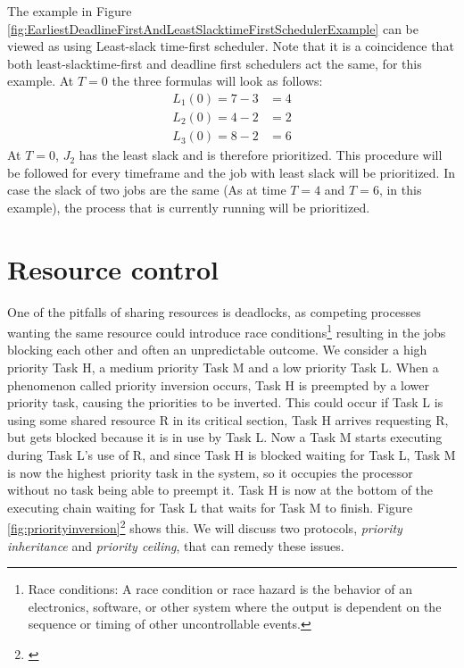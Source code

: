 \noindent The example in Figure \ref{fig:EarliestDeadlineFirstAndLeastSlacktimeFirstSchedulerExample} can be viewed as using Least-slack time-first scheduler. Note that it is a coincidence that both least-slacktime-first and deadline first schedulers act the same, for this example. At $T=0$ the three formulas will look as follows:
\begin{align}
	L_1(0)=7-3&=4 \\
	L_2(0)=4-2&=2 \\
	L_3(0)=8-2&=6
\end{align}
At $T=0$, $J_2$ has the least slack and is therefore prioritized. This procedure will be followed for every timeframe and the job with least slack will be prioritized. In case the slack of two jobs are the same (As at time $T=4$ and $T=6$, in this example), the process that is currently running will be prioritized.

\section{Resource control}

One of the pitfalls of sharing resources is deadlocks, as competing processes wanting the same resource could introduce race conditions\footnote{Race conditions: A race condition or race hazard is the behavior of an electronics, software, or other system where the output is dependent on the sequence or timing of other uncontrollable events.} resulting in the jobs blocking each other and often an unpredictable outcome. We consider a high priority Task H, a medium priority Task M and a low priority Task L. When a phenomenon called priority inversion occurs, Task H is preempted by a lower priority task, causing the priorities to be inverted. This could occur if Task L is using some shared resource R in its critical section, Task H arrives requesting R, but gets blocked because it is in use by Task L. Now a Task M starts executing during Task L's use of R, and since Task H is blocked waiting for Task L, Task M is now the highest priority task in the system, so it occupies the processor without no task being able to preempt it. Task H is now at the bottom of the executing chain waiting for Task L that waits for Task M to finish. Figure \ref{fig:priorityinversion}\footnote{\cite{Bruno2011}} shows this.  We will discuss two protocols, \textit{priority inheritance} and \textit{priority ceiling}, that can remedy these issues.

